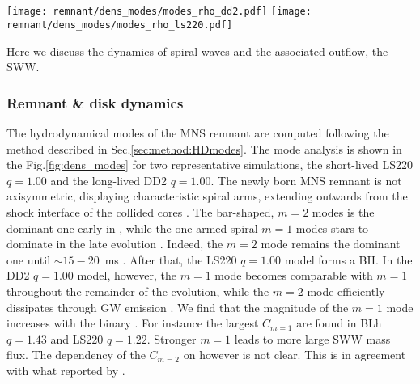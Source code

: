 \subsection{\swind{}}
\label{sec:spiralw}

\begin{figure*}[t]
    \centering 
    \texttt{[image: remnant/dens\_modes/modes\_rho\_dd2.pdf]}
    \texttt{[image: remnant/dens\_modes/modes\_rho\_ls220.pdf]}
    \caption{Modes analysis for exemplary equal-mass long-live and short-lived
        remnants. The evolution of the $m=2$ and the $m=1$ monitored by
        Eq.~\eqref{eq:modes} is shown for the DD2 and LS220 remnant with and
        without turbulent viscosity. The $m=2$ mode in the long-lived
        remnant is strongly damped by the emission of gravitational
        radiation and becomes comparable to the $m=1$ mode on a timescale of
        ${\gtrsim}20\,$ms. Turbulent viscosity sustain the $m=2$ mode for
        a longer period. The $m=2$ mode is instead dominant to collapse in
        the short-lived remnant.
        (Adopted from \cite{Nedora:2020pak})
    }
    \label{fig:dens_modes}
\end{figure*}

Here we discuss the dynamics of spiral waves and the associated outflow, the \ac{SWW}.


\subsubsection{Remnant \& disk dynamics}


The hydrodynamical modes of the \ac{MNS} remnant are computed following the 
method described in Sec.\ref{sec:method:HDmodes}. 
The mode analysis is shown in the Fig.\ref{fig:dens_modes} for two representative 
simulations, the short-lived LS220 $q=1.00$ and the long-lived DD2 $q=1.00$.
The newly born \ac{MNS} remnant is not axisymmetric, displaying characteristic 
spiral arms, extending outwards from the shock interface of the collided cores 
\citep{Shibata:1999wm,Shibata:2006nm,Bernuzzi:2013rza,Kastaun:2014fna,East:2015vix,Paschalidis:2015mla,Radice:2016gym,Lehner:2016wjg}.
The bar-shaped, $m=2$ modes is the dominant one early in \pmerg{}, while the 
one-armed spiral $m=1$ modes stars to dominate in the late evolution 
\citep{East:2015vix,Paschalidis:2015mla,Radice:2016gym,Lehner:2016wjg,Bernuzzi:2013rza,Kastaun:2014fna}.
Indeed, the $m=2$ mode remains the dominant one until $\sim15-20$~ms \pmerg{}. 
After that, the LS220 $q=1.00$ model forms a \ac{BH}. 
In the DD2 $q=1.00$ model, however, the $m=1$ mode becomes comparable with $m=1$ 
throughout the remainder of the evolution, while the $m=2$ mode efficiently dissipates 
through \ac{GW} emission \citep{Bernuzzi:2015opx,Radice:2016gym}.
We find that the magnitude of the $m=1$ mode increases with the binary \mr{}.
For instance the largest $C_{m=1}$ are found in BLh $q=1.43$ and LS220 $q=1.22$.
Stronger $m=1$ leads to more large \ac{SWW} mass flux.
The dependency of the $C_{m=2}$ on \mr{} however is not clear. 
This is in agreement with what reported by \citet{Lehner:2016wjg}.

